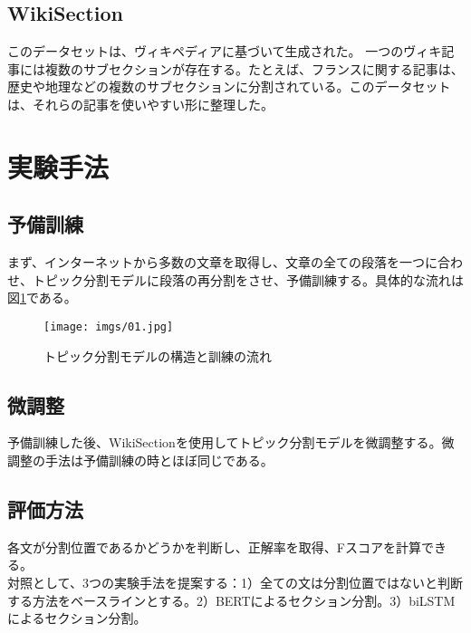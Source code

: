 \documentclass[a4paper]{article}
\begin{document}
\subsection{WikiSection}
このデータセットは、ヴィキペディアに基づいて生成された。 一つのヴィキ記事には複数のサブセクションが存在する。たとえば、フランスに関する記事は、歴史や地理などの複数のサブセクションに分割されている。このデータセットは、それらの記事を使いやすい形に整理した。

\section{実験手法}

\subsection{予備訓練}

まず、インターネットから多数の文章を取得し、文章の全ての段落を一つに合わせ、トピック分割モデルに段落の再分割をさせ、予備訓練する。具体的な流れは図\ref{fig:img1}である。

\begin{figure}[H]
  \texttt{[image: imgs/01.jpg]}
  \caption{トピック分割モデルの構造と訓練の流れ}
  \label{fig:img1}
\end{figure}

\subsection{微調整}

予備訓練した後、WikiSectionを使用してトピック分割モデルを微調整する。微調整の手法は予備訓練の時とほぼ同じである。

\subsection{評価方法}

各文が分割位置であるかどうかを判断し、正解率を取得、Fスコアを計算できる。\\

対照として、3つの実験手法を提案する：1）全ての文は分割位置ではないと判断する方法をベースラインとする。2）BERTによるセクション分割。3）biLSTMによるセクション分割。

\printbibliography
\end{document}
